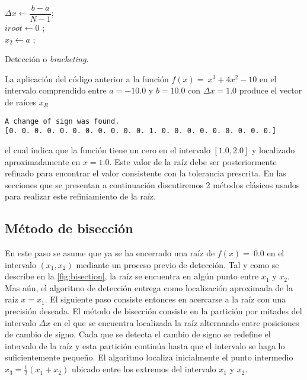\begin{algorithm}[H]
\SetAlgoLined
{}
\BlankLine

$\Delta x \leftarrow \dfrac{b - a}{N - 1}$;\\
\BlankLine
$iroot \leftarrow 0$ ;\\
\BlankLine
$x_2 \leftarrow a$ ;\\
\BlankLine
{}
\BlankLine
\caption{Detección o \textit{bracketing}.}
\label{alg:brack}
%
\end{algorithm}

La aplicación del código anterior a la función $f(x) = \ x^3 + 4x^2 - 10$ en el intervalo comprendido entre $a=-10.0$ y $b=10.0$ con $\Delta x = 1.0$ produce el vector de raíces $x_R$

\begin{verbatim}
A change of sign was found.
[0. 0. 0. 0. 0. 0. 0. 0. 0. 0. 0. 1. 0. 0. 0. 0. 0. 0. 0. 0. 0.]
\end{verbatim}

 el cual indica que la función tiene un cero en el intervalo $[1.0,2.0]$ y localizado aproximadamente en $x = 1.0$. Este valor de la raíz debe ser posteriormente refinado para encontrar el valor consistente con la tolerancia prescrita. En las secciones que se presentan a continuación discutiremos 2 métodos clásicos usados para realizar este refiniamiento de la raíz.


\subsection{Método de bisección}
En este paso se asume que ya se ha encerrado una raíz de $f(x) = \ 0.0$ en el intervalo $(x_1, x_2)$ mediante un proceso previo de detección.  Tal y como se describe en la \cref{fig:bisection}, la raíz se encuentra en algún punto entre $x_1$ y $x_2$. Mas aún, el algoritmo de detección entrega como localización aproximada de la raíz $x = x_1$. El siguiente paso consiste entonces en acercarse a la raíz con una precisión deseada. El método de bisección consiste en la partición por mitades del intervalo $\Delta x$ en el que se encuentra localizada la raíz alternando entre posiciones de cambio de signo. Cada que se detecta el cambio de signo se redefine el intervalo de la raíz y esta partición continúa hasta que el intervalo se haga lo suficientemente pequeño. El algoritmo localiza inicialmente el punto intermedio ${x_3} = \frac{1}{2}(x_1 + x_2)$ ubicado entre los extremos del intervalo $x_1$ y $x_2$.

